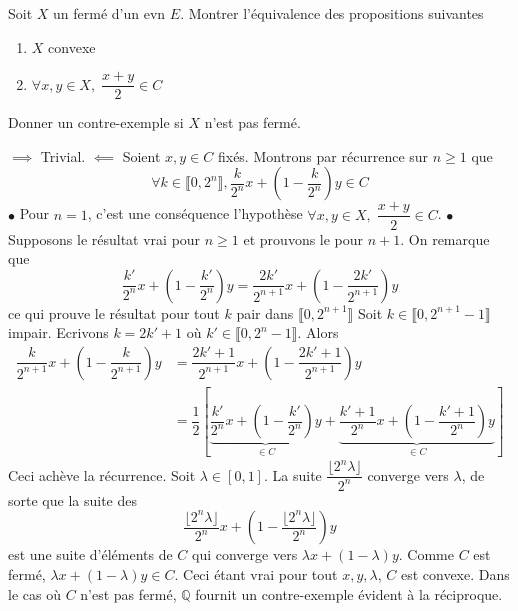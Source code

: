 \documentclass{fancybook}
\begin{document}
\begin{exercice}
Soit $X$ un fermé d'un evn $E$. Montrer l'équivalence des propositions suivantes
\begin{enumerate}
\item $X$ convexe
\item $\forall x,y \in X, \; \dfrac{x+y}{2} \in C $
\end{enumerate}
Donner un contre-exemple si $X$ n'est pas fermé.
\end{exercice}
$\implies$ Trivial. \newline
$\impliedby$ Soient $x,y\in C$ fixés. Montrons par récurrence sur $n\geq 1$ que $$\forall k \in \llbracket 0,2^n \rrbracket,\dfrac{k}{2^n}x+ \left( 1-\dfrac{k}{2^n} \right)y\in C$$\newline \newline 
$\bullet$ Pour $n=1$, c'est une conséquence l'hypothèse $\forall x,y \in X, \; \dfrac{x+y}{2} \in C $. \newline
$\bullet$ Supposons le résultat vrai pour $n\geq 1$ et prouvons le pour $n+1$.\newline
On remarque que $$\dfrac{k'}{2^n}x+ \left( 1-\dfrac{k'}{2^n} \right)y =  \dfrac{2k'}{2^{n+1}}x+ \left( 1-\dfrac{2k'}{2^{n+1}} \right)y$$ ce qui prouve le résultat pour tout $k$ pair dans $\llbracket 0,2^{n+1} \rrbracket$\newline
Soit $k\in \llbracket 0,2^{n+1}-1 \rrbracket$ impair. Ecrivons $k=2k'+1$ où $k'\in \llbracket 0,2^n-1 \rrbracket$. Alors
$$ \begin{aligned}
\dfrac{k}{2^{n+1}}x+ \left( 1-\dfrac{k}{2^{n+1}} \right)y &= \dfrac{2k'+1}{2^{n+1}}x+ \left( 1-\dfrac{2k'+1}{2^{n+1}} \right)y\\
&= \dfrac{1}{2} \left[ \underbrace{\dfrac{k'}{2^n}x+ \left( 1-\dfrac{k'}{2^n} \right)y}_{\in C}  + \underbrace{\dfrac{k'+1}{2^n}x+ \left( 1-\dfrac{k'+1}{2^n} \right)y}_{\in C} \right]
\end{aligned}$$
Ceci achève la récurrence.\newline \newline
Soit $\lambda \in [0,1]$. La suite $\dfrac{\lfloor 2^n \lambda\rfloor}{2^n}$ converge vers $\lambda$, de sorte que la suite des $$\dfrac{\lfloor 2^n \lambda\rfloor}{2^n}x + \left(1- \dfrac{\lfloor 2^n \lambda\rfloor}{2^n}\right)y$$ est une suite d'éléments de $C$ qui converge vers $\lambda x +(1-\lambda)y$. Comme $C$ est fermé, $\lambda x +(1-\lambda)y\in C$. Ceci étant vrai pour tout $x,y,\lambda$, $C$ est convexe.\newline \newline
Dans le cas où $C$ n'est pas fermé, $\mathbb Q$ fournit un contre-exemple évident à la réciproque.
\end{document}
